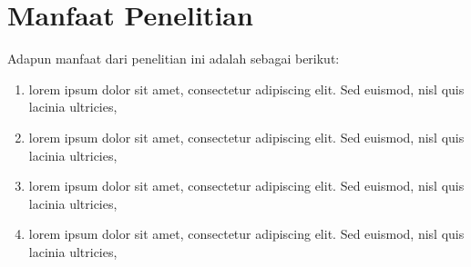\section{Manfaat Penelitian}
Adapun manfaat dari penelitian ini adalah sebagai berikut:
\begin{enumerate}
	\item lorem ipsum dolor sit amet, consectetur adipiscing elit. Sed euismod, nisl quis lacinia ultricies,
	\item lorem ipsum dolor sit amet, consectetur adipiscing elit. Sed euismod, nisl quis lacinia ultricies,
	\item lorem ipsum dolor sit amet, consectetur adipiscing elit. Sed euismod, nisl quis lacinia ultricies,
	\item lorem ipsum dolor sit amet, consectetur adipiscing elit. Sed euismod, nisl quis lacinia ultricies,

\end{enumerate}



\begin{comment}

\end{comment}
